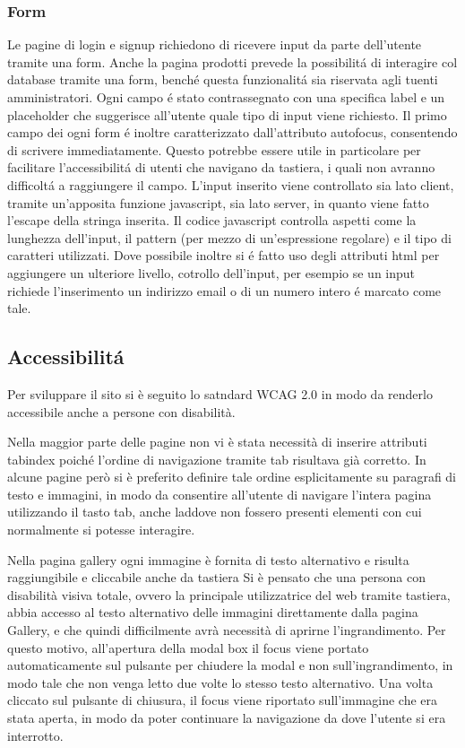 		\subsubsection{Form}
		Le pagine di login e signup richiedono di ricevere input da parte dell'utente tramite una form.
		Anche la pagina prodotti prevede la possibilit\'a di interagire col database tramite una form, bench\'e questa funzionalit\'a sia riservata agli tuenti amministratori.
		Ogni campo \'e stato contrassegnato con una specifica label e un placeholder che suggerisce all'utente quale tipo di input viene richiesto.
		Il primo campo dei ogni form \'e inoltre caratterizzato dall'attributo autofocus, consentendo di scrivere immediatamente.
		Questo potrebbe essere utile in particolare per facilitare l'accessibilit\'a di utenti che navigano da tastiera, i quali non avranno difficolt\'a  a raggiungere il campo.
		L'input inserito viene controllato sia lato client, tramite un'apposita funzione javascript, sia lato server, in quanto viene fatto l'escape della stringa inserita.
		Il codice javascript controlla aspetti come la lunghezza dell'input, il pattern (per mezzo di un'espressione regolare) e il tipo di caratteri utilizzati.
		Dove possibile inoltre si \'e fatto uso degli attributi html per aggiungere un ulteriore livello, cotrollo dell'input, per esempio se un input richiede l'inserimento un indirizzo email o di un numero intero \'e marcato come tale.

	\subsection{Accessibilit\'a}
		Per sviluppare il sito si è seguito lo satndard WCAG 2.0 in modo da renderlo accessibile anche a persone con disabilità.

		Nella maggior parte delle pagine non vi è stata necessità di inserire attributi tabindex poiché l'ordine di navigazione tramite tab risultava già corretto.
		In alcune pagine però si è preferito definire tale ordine esplicitamente su paragrafi di testo e immagini, in modo da consentire all'utente di navigare l'intera pagina utilizzando il tasto tab, anche laddove non fossero presenti elementi con cui normalmente si potesse interagire.

		Nella pagina gallery ogni immagine è fornita di testo alternativo e risulta raggiungibile e cliccabile anche da tastiera
		Si è pensato che una persona con disabilità visiva totale, ovvero la principale utilizzatrice del web tramite tastiera, abbia accesso al testo alternativo delle immagini direttamente dalla pagina Gallery, e che quindi difficilmente avrà necessità di aprirne l'ingrandimento.
		Per questo motivo, all'apertura della modal box il focus viene portato automaticamente sul pulsante per chiudere la modal e non sull'ingrandimento, in modo tale che non venga letto due volte lo stesso testo alternativo.
		Una volta cliccato sul pulsante di chiusura, il focus viene riportato sull'immagine che era stata aperta, in modo da poter continuare la navigazione da dove l'utente si era interrotto. 
